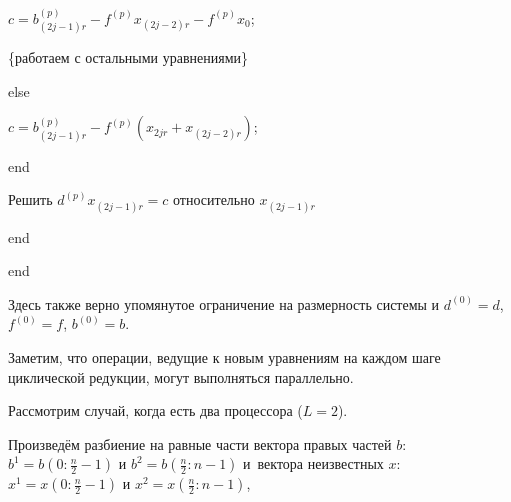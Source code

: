 {\hspace{.5cm}\hspace{.5cm}\hspace{.5cm}

$ c=b^{(p)}_{(2j-1)r}-f^{(p)}x_{(2j-2)r}-f^{(p)}x_0$;



\hspace{.5cm}

\{работаем с остальными уравнениями\}



\hspace{.5cm}\hspace{.5cm}

else 



\hspace{.5cm}\hspace{.5cm}\hspace{.5cm}$ c=b^{(p)}_{(2j-1)r}-f^{(p)}(x_{2jr}+x_{(2j-2)r})$;



\hspace{.5cm}\hspace{.5cm}end



\hspace{.5cm}

Решить $ d^{(p)}x_{(2j-1)r}=c$ относительно $x_{(2j-1)r}$



\hspace{.5cm} end



end



}



\vspace{3mm}



Здесь также верно упомянутое ограничение на размерность системы и $d^{(0)}=d$, $f^{(0)}=f$, $b^{(0)}=b$.




Заметим, что операции, ведущие к новым уравнениям на каждом шаге циклической редукции, могут выполняться параллельно. 

Рассмотрим случай, когда есть два процессора ($L=2$).



Произведём разбиение на равные части вектора правых частей $b$: $b^1=b(0:\frac{n}{2}-1)$ и $b^2=b(\frac{n}{2}:n-1)$ и~вектора неизвестных $x$: $x^1=x(0:\frac{n}{2}-1)$ и $x^2=x(\frac{n}{2}:n-1)$, 

